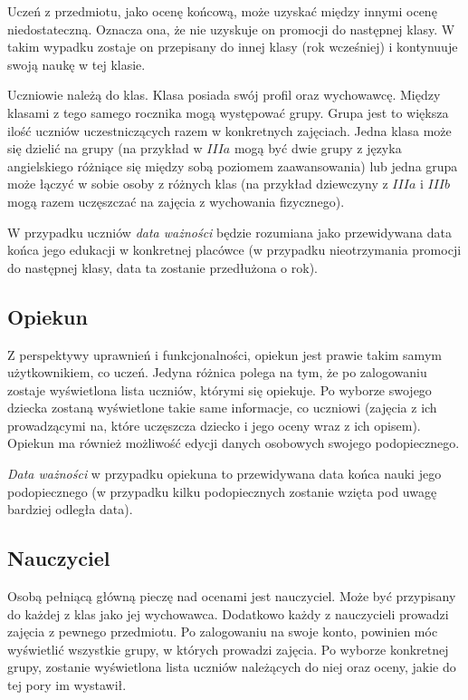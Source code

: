 \documentclass[12pt, titlepage]{article}
\begin{document}
Uczeń z przedmiotu, jako ocenę końcową, może uzyskać między innymi ocenę niedostateczną. Oznacza ona, że nie uzyskuje on promocji do następnej klasy. W takim wypadku zostaje on  przepisany do innej klasy (rok wcześniej) i kontynuuje swoją naukę w tej klasie.

Uczniowie należą do klas. Klasa posiada swój profil oraz wychowawcę. Między klasami z tego samego rocznika mogą występować grupy. Grupa jest to większa ilość uczniów uczestniczących razem w konkretnych zajęciach. Jedna klasa może się dzielić na grupy (na przykład w $IIIa$ mogą być dwie grupy z języka angielskiego różniące się między sobą poziomem zaawansowania) lub jedna grupa może łączyć w sobie osoby z różnych klas (na przykład dziewczyny z $IIIa$ i $IIIb$ mogą razem uczęszczać na zajęcia z wychowania fizycznego).  

W przypadku uczniów \textit{data ważności} będzie rozumiana jako przewidywana data końca jego edukacji w konkretnej placówce (w przypadku nieotrzymania promocji do następnej klasy, data ta zostanie przedłużona o rok).

\subsection{Opiekun}

Z perspektywy uprawnień i funkcjonalności, opiekun jest prawie takim samym użytkownikiem, co uczeń. Jedyna różnica polega na tym, że po zalogowaniu zostaje wyświetlona lista uczniów, którymi się opiekuje. Po wyborze swojego dziecka zostaną wyświetlone takie same informacje, co uczniowi (zajęcia z ich prowadzącymi na, które uczęszcza dziecko i jego oceny wraz z ich opisem).
Opiekun ma również możliwość edycji danych osobowych swojego podopiecznego.

\textit{Data ważności} w przypadku opiekuna to przewidywana data końca nauki jego podopiecznego (w przypadku kilku podopiecznych zostanie wzięta pod uwagę bardziej odległa data). 

\subsection{Nauczyciel}

Osobą pełniącą główną pieczę nad ocenami jest nauczyciel. Może być przypisany do każdej z klas jako jej wychowawca. Dodatkowo każdy z nauczycieli prowadzi zajęcia z pewnego przedmiotu. 
Po zalogowaniu na swoje konto, powinien móc wyświetlić wszystkie grupy, w których prowadzi zajęcia. Po wyborze konkretnej grupy, zostanie wyświetlona lista uczniów należących do niej oraz oceny, jakie do tej pory im wystawił.
\end{document}
